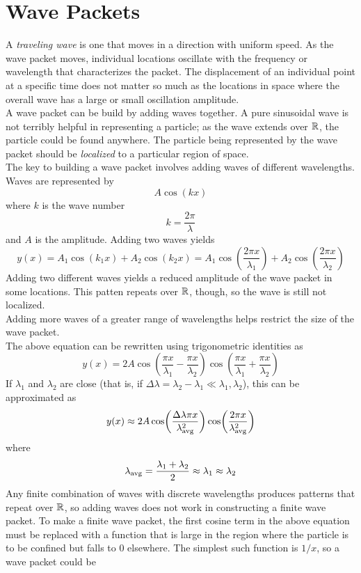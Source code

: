 \documentclass{subfiles}
\begin{document}
	\section{Wave Packets}
		A \textit{traveling wave} is one that moves in a direction with uniform speed. As the wave packet moves, individual locations oscillate with the frequency or wavelength that characterizes the packet. The displacement of an individual point at a specific time does not matter so much as the locations in space where the overall wave has a large or small oscillation amplitude. \\
		A wave packet can be build by adding waves together. A pure sinusoidal wave is not terribly helpful in representing a particle; as the wave extends over \(\mathbb{R}\), the particle could be found anywhere. The particle being represented by the wave packet should be \textit{localized} to a particular region of space. \\
		The key to building a wave packet involves adding waves of different wavelengths. Waves are represented by
			\[A\cos(kx)\]
			where \(k\) is the wave number
			\[k = \frac{2\pi}{\lambda}\]
			and \(A\) is the amplitude. Adding two waves yields
			\[
				y(x) = A_1\cos(k_1x) + A_2\cos(k_2x)
					= A_1\cos(\frac{2\pi x}{\lambda_1}) + A_2\cos(\frac{2\pi x}{\lambda_2})
			\]
			Adding two different waves yields a reduced amplitude of the wave packet in some locations. This patten repeats over \(\mathbb{R}\), though, so the wave is still not localized. \\
		Adding more waves of a greater range of wavelengths helps restrict the size of the wave packet. \\
		The above equation can be rewritten using trigonometric identities as
			\[y(x) = 2A\cos(\frac{\pi x}{\lambda_1} - \frac{\pi x}{\lambda_2})\cos(\frac{\pi x}{\lambda_1} + \frac{\pi x}{\lambda_2}) \tag{combined static wave}\]
			If \(\lambda_1\) and \(\lambda_2\) are close (that is, if \(\Delta\lambda = \lambda_2 - \lambda_1 \ll \lambda_1, \lambda_2\)), this can be approximated as
			\[y(x) \approx 2A\cos(\frac{\Delta\lambda\pi x}{\lambda_{\text{avg}}^2})\cos(\frac{2\pi x}{\lambda_{\text{avg}}^2})\]
			where
			\[
				\lambda_{\text{avg}} = \frac{\lambda_1 + \lambda_2}{2}
					\approx \lambda_1 
					\approx \lambda_2
			\]
			Any finite combination of waves with discrete wavelengths produces patterns that repeat over \(\mathbb{R}\), so adding waves does not work in constructing a finite wave packet. To make a finite wave packet, the first cosine term in the above equation must be replaced with a function that is large in the region where the particle is to be confined but falls to 0 elsewhere. The simplest such function is \(1/x\), so a wave packet could be
\end{document}
